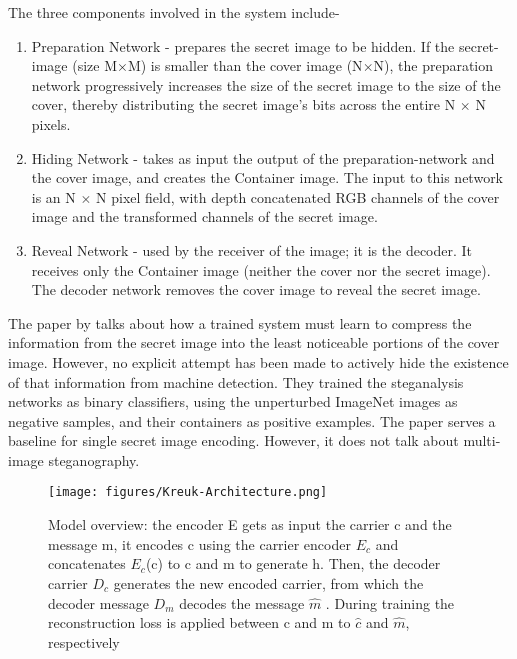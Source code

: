 \documentclass{article}
\begin{document}
The three components involved in the system include-
    \begin{enumerate}{}
    \item Preparation Network - prepares the secret image to be hidden. If the secret-image (size M$\times$M) is smaller than the cover image (N$\times$N), the preparation network progressively increases the size of the secret image to the size of the cover, thereby distributing the secret image’s bits across the entire N $\times$ N pixels.
    \item Hiding Network - takes as input the output of the preparation-network and the cover image, and creates the Container image. The input to this network is an N $\times$ N pixel field, with depth concatenated RGB channels of the cover image and the transformed channels of the secret image.
    \item Reveal Network - used by the receiver of the image; it is the decoder. It receives only the Container image (neither the cover nor the secret image). The decoder network removes the cover image to reveal the secret image.
    \end{enumerate}
    
The paper by \cite{NIPS2017_6802} talks about how a trained system must learn to compress the information from the secret image into the least noticeable portions of the cover image. However, no explicit attempt has been made to actively hide the existence of that information from machine detection. They trained the steganalysis networks as binary classifiers, using the unperturbed ImageNet images as negative samples, and their containers as positive examples. The paper serves a baseline for single secret image encoding. However, it does not talk about multi-image steganography.

\begin{figure}[h]
\vskip 0.2in
\begin{center}
\centerline{\texttt{[image: figures/Kreuk-Architecture.png]}}
\caption{Model overview: the encoder E gets as input the carrier c and the message m, it encodes c using the carrier encoder $E_c$ and concatenates $E_c$(c) to c and m to generate h. Then, the decoder carrier $D_c$ generates the new encoded carrier, from which the decoder message $D_m$ decodes the message $\hat{m}$ . During training the reconstruction loss is applied between c and m to $\hat{c}$ and $\hat{m}$, respectively}
\label{fig:kreuk_arch}
\end{center}
\vskip -0.4in
\end{figure}
\end{document}
